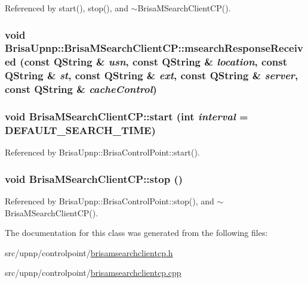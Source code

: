 Referenced by start(), stop(), and $\sim$BrisaMSearchClientCP().\hypertarget{classBrisaUpnp_1_1BrisaMSearchClientCP_abebd58a64a0cb18679d40ce2e0ca76a2}{
\subsubsection[{msearchResponseReceived}]{\setlength{\rightskip}{0pt plus 5cm}void BrisaUpnp::BrisaMSearchClientCP::msearchResponseReceived (const QString \& {\em usn}, \/  const QString \& {\em location}, \/  const QString \& {\em st}, \/  const QString \& {\em ext}, \/  const QString \& {\em server}, \/  const QString \& {\em cacheControl})}}
\label{classBrisaUpnp_1_1BrisaMSearchClientCP_abebd58a64a0cb18679d40ce2e0ca76a2}
\hypertarget{classBrisaUpnp_1_1BrisaMSearchClientCP_a6b1b90d6f85a8fac4f90166c45524a26}{
\subsubsection[{start}]{\setlength{\rightskip}{0pt plus 5cm}void BrisaMSearchClientCP::start (int {\em interval} = {\ttfamily DEFAULT\_\-SEARCH\_\-TIME})}}
\label{classBrisaUpnp_1_1BrisaMSearchClientCP_a6b1b90d6f85a8fac4f90166c45524a26}


Referenced by BrisaUpnp::BrisaControlPoint::start().\hypertarget{classBrisaUpnp_1_1BrisaMSearchClientCP_af56138f5ec0f25a51662888132eef28e}{
\subsubsection[{stop}]{\setlength{\rightskip}{0pt plus 5cm}void BrisaMSearchClientCP::stop ()}}
\label{classBrisaUpnp_1_1BrisaMSearchClientCP_af56138f5ec0f25a51662888132eef28e}


Referenced by BrisaUpnp::BrisaControlPoint::stop(), and $\sim$BrisaMSearchClientCP().

The documentation for this class was generated from the following files:\begin{DoxyCompactItemize}
\item 
src/upnp/controlpoint/\hyperlink{brisamsearchclientcp_8h}{brisamsearchclientcp.h}\item 
src/upnp/controlpoint/\hyperlink{brisamsearchclientcp_8cpp}{brisamsearchclientcp.cpp}\end{DoxyCompactItemize}
